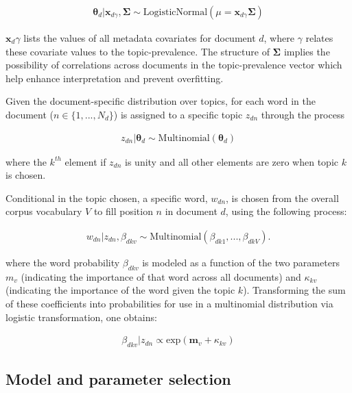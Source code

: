 \documentclass[12pt,a4paper,notitlepage]{article}
\begin{document}
\begin{align*}
	\boldsymbol{\theta}_d|\boldsymbol{x}_{d\gamma},\boldsymbol{\Sigma} \sim \textrm{LogisticNormal}(\mu = \boldsymbol{x}_{d\gamma}\boldsymbol{\Sigma})
\end{align*}

$\boldsymbol{x}_d\gamma$ lists the values of all metadata covariates for document $d$, where $\gamma$ relates these covariate values to the topic-prevalence. The structure of $\boldsymbol{\Sigma}$ implies the possibility of correlations across documents in the topic-prevalence vector which help enhance interpretation and prevent overfitting. 

Given the document-specific distribution over topics, for each word in the document ($n \in \lbrace 1,...,N_d\rbrace$) is assigned to a specific topic $z_{dn}$ through the process

\begin{align*}
	z_{dn}|\boldsymbol{\theta}_d \sim \textrm{Multinomial}(\boldsymbol{\theta}_d)
\end{align*}

where the $k^{th}$ element if $z_{dn}$ is unity and all other elements are zero when topic $k$ is chosen. 

Conditional in the topic chosen, a specific word, $w_{dn}$, is chosen from the overall corpus vocabulary $V$ to fill position $n$ in document $d$, using the following process:

\begin{align*}
	w_{dn}|z_{dn},\beta_{dkv} \sim \textrm{Multinomial}(\beta_{dk1},...,\beta_{dkV}).
\end{align*}

where the word probability $\beta_{dkv}$ is modeled as a function of the two parameters $m_v$ (indicating the importance of that word across all documents) and $\kappa_{kv}$ (indicating the importance of the word given the topic $k$). Transforming the sum of these coefficients into probabilities for use in a multinomial distribution via logistic transformation, one obtains:

\begin{align*}
	\beta_{dkv}|z_{dn}\propto\textrm{exp}(\boldsymbol{m}_v+\kappa_{kv})
\end{align*}


\subsection{Model and parameter selection}
\end{document}
